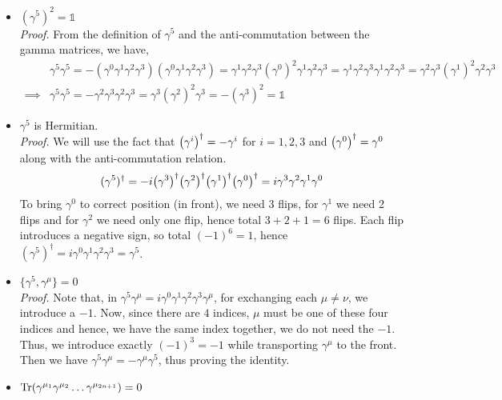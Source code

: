 \begin{itemize}
    \begin{align*}
      2\Tr(\gamma^\mu\gamma^\nu) =  \Tr\{\gamma^\mu,\gamma^\nu\} = \Tr (2\eta^{\mu\nu}\mathds{1}) =2\eta^{\mu\nu} \times 4 \implies \Tr(\gamma^\mu\gamma^\nu) = 4 \eta^{\mu\nu}
    \end{align*}
    \item $(\gamma^5)^2 = \mathds{1}$\\[0.2cm]
    \textit{Proof.} From the definition of $\gamma^5$ and the anti-commutation between the gamma matrices, we have,
    \begin{align*}
        &\gamma^5 \gamma^5 = - (\gamma^0 \gamma^1 \gamma^2 \gamma^3 )(\gamma^0 \gamma^1 \gamma^2 \gamma^3 ) =\gamma^1\gamma^2\gamma^3(\gamma^0)^2 \gamma^1 \gamma^2\gamma^3 =\gamma^1\gamma^2\gamma^3\gamma^1 \gamma^2\gamma^3=\gamma^2\gamma^3 (\gamma^1)^2\gamma^2\gamma^3\\
        \implies &\gamma^5 \gamma^5=-\gamma^2\gamma^3 \gamma^2 \gamma^3 = \gamma^3( \gamma^2)^2 \gamma^3 = -(\gamma^3)^2 = \mathds{1}
    \end{align*}
    \item $\gamma^5$ is Hermitian. \\[0.25cm]
    \textit{Proof.} We will use the fact that $\qty(\gamma^i)^\dagger = -\gamma^i$ for $i=1,2,3$ and $\qty(\gamma^0)^\dagger = \gamma^0$ along with the anti-commutation relation. \begin{align*}
        (\gamma^5)^\dagger = -i \qty(\gamma^3)^\dagger \qty(\gamma^2)^\dagger \qty(\gamma^1)^\dagger \qty(\gamma^0)^\dagger = i \gamma^3 \gamma^2 \gamma^1 \gamma^0 
    \end{align*}
    To bring $\gamma^0$ to correct position (in front), we need 3 flips, for $\gamma^1$ we need 2 flips and for $\gamma^2$ we need only one flip, hence total $3+2+1=6$ flips. Each flip introduces a negative sign, so total $(-1)^6=1$, hence $(\gamma^5)^\dagger = i\gamma^0 \gamma^1 \gamma^2 \gamma^3 =\gamma^5$.
    \item $\{\gamma^5, \gamma^\mu\} = 0 $\\[0.25cm]
    \textit{Proof.} Note that, in $\gamma^5\gamma^\mu = i \gamma^0 \gamma^1 \gamma^2 \gamma^3 \gamma^\mu$, for exchanging each $\mu\neq \nu$, we introduce a $-1$. Now, since there are $4$ indices, $\mu$ must be one of these four indices and hence, we have the same index together, we do not need the $-1$. Thus, we introduce exactly $(-1)^3 = -1$ while transporting $\gamma^\mu$ to the front. Then we have $\gamma^5\gamma^\mu = -\gamma^\mu\gamma^5$, thus proving the identity. 
    \item $\Tr (\gamma^{\mu_1 }\gamma^{\mu_2 }\ldots \gamma^{\mu_{2n+1} })=0$ \\[0.25cm]

\end{itemize}
